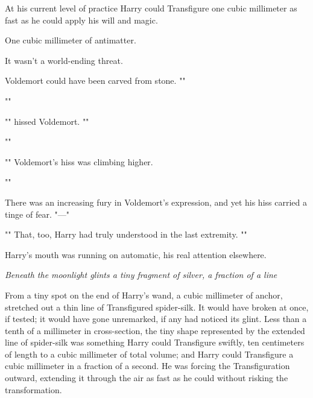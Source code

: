 At his current level of practice Harry could Transfigure one cubic millimeter
as fast as he could apply his will and magic.

One cubic millimeter of antimatter.

It wasn't a world-ending threat.

Voldemort could have been carved from stone. ""

""

"" hissed Voldemort. ""

""

"" Voldemort's hiss was climbing
higher.

""

There was an increasing fury in Voldemort's expression, and yet his hiss
carried a tinge of fear. "—"

"" That, too, Harry had truly understood in the last extremity.
""

Harry's mouth was running on automatic, his real attention elsewhere.

\emph{Beneath the moonlight glints a tiny fragment of silver, a fraction of a
line{\el}}

From a tiny spot on the end of Harry's wand, a cubic millimeter of anchor,
stretched out a thin line of Transfigured spider-silk. It would have broken at
once, if tested; it would have gone unremarked, if any had noticed its glint.
Less than a tenth of a millimeter in cross-section, the tiny shape represented
by the extended line of spider-silk was something Harry could Transfigure
swiftly, ten centimeters of length to a cubic millimeter of total volume; and
Harry could Transfigure a cubic millimeter in a fraction of a second. He was
forcing the Transfiguration outward, extending it through the air as fast as he
could without risking the transformation.


